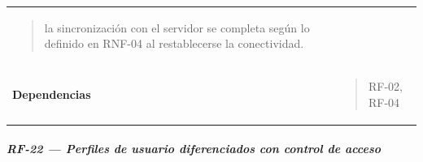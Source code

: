 \documentclass[
]{article}
\begin{document}
{\begin{longtable}[]{@{}
  >{\raggedright\arraybackslash}p{}
  >{\raggedright\arraybackslash}p{}@{}}
\begin{minipage}[t]{\linewidth}
\begin{quote}
la sincronización con el servidor se completa según lo definido en
RNF-04 al restablecerse la conectividad.
\end{quote}
\end{minipage} \\
\textbf{Dependencias} & \begin{minipage}[t]{\linewidth}\raggedright
\begin{quote}
RF-02, RF-04
\end{quote}
\end{minipage} \\
\end{longtable}
}

\subparagraph{RF-22 --- Perfiles de usuario diferenciados con control de
acceso}\label{rf-22-perfiles-de-usuario-diferenciados-con-control-de-acceso}
\end{document}
